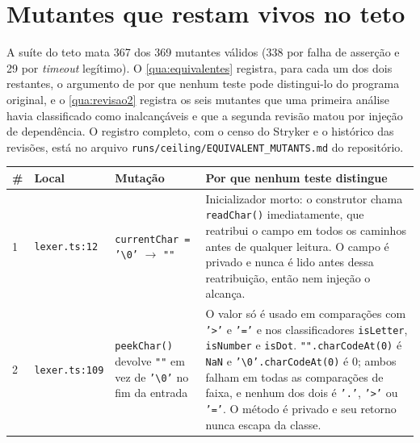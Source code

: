 
\section{Mutantes que restam vivos no teto}
\label{ap:equivalentes}

A suíte do teto mata 367 dos 369 mutantes válidos (338 por falha de asserção e 29 por \textit{timeout} legítimo). O \autoref{qua:equivalentes} registra, para cada um dos dois restantes, o argumento de por que nenhum teste pode distingui-lo do programa original, e o \autoref{qua:revisao2} registra os seis mutantes que uma primeira análise havia classificado como inalcançáveis e que a segunda revisão matou por injeção de dependência. O registro completo, com o censo do Stryker e o histórico das revisões, está no arquivo \texttt{runs/ceiling/EQUIVALENT\_MUTANTS.md} do repositório.

\begin{quadro}[htb]
    \centering
    \ABNTEXfontereduzida
    \begin{minipage}{\textwidth}
        \caption{Mutantes equivalentes do teto}
        \label{qua:equivalentes}
        \centering
        \begin{tabular}{p{0.5cm}p{2.6cm}p{3.8cm}p{7.9cm}}
            \toprule
            \textbf{\#} & \textbf{Local} & \textbf{Mutação} & \textbf{Por que nenhum teste distingue} \\
            \midrule
            1 & \texttt{lexer.ts:12} & \texttt{currentChar = '\textbackslash 0'} $\to$ \texttt{""} & Inicializador morto: o construtor chama \texttt{readChar()} imediatamente, que reatribui o campo em todos os caminhos antes de qualquer leitura. O campo é privado e nunca é lido antes dessa reatribuição, então nem injeção o alcança. \\
            2 & \texttt{lexer.ts:109} & \texttt{peekChar()} devolve \texttt{""} em vez de \texttt{'\textbackslash 0'} no fim da entrada & O valor só é usado em comparações com \texttt{'>'} e \texttt{'='} e nos classificadores \texttt{isLetter}, \texttt{isNumber} e \texttt{isDot}. \texttt{"".charCodeAt(0)} é \texttt{NaN} e \texttt{'\textbackslash 0'.charCodeAt(0)} é 0; ambos falham em todas as comparações de faixa, e nenhum dos dois é \texttt{'.'}, \texttt{'>'} ou \texttt{'='}. O método é privado e seu retorno nunca escapa da classe. \\
            \bottomrule
        \end{tabular}
    \end{minipage}
\end{quadro}

